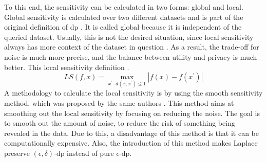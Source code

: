 To this end, the sensitivity can be calculated in two forms: global and local.
Global sensitivity is calculated over two different datasets and is part of the original definition of \gls{dp} \citep{dwork_differential_2006}.
It is called global because it is independent of the queried dataset.
Usually, this is not the desired situation, since local sensitivity always has more context of the dataset in question \citep{nissim_smooth_2007}.
As a result, the trade-off for noise is much more precise, and the balance between utility and privacy is much better.
This local sensitivity definition \citep{nissim_smooth_2007}.
\begin{equation}
  LS(f,x)=\operatorname*{max}_{x^{\prime}\cdot d(x,x^{\prime})\leq1}|f(x)-f(x^{\prime})|
  \label{local-sensitivity}
\end{equation}
A methodology to calculate the local sensitivity is by using the smooth sensitivity method, which was proposed by the same authors \citep{nissim_smooth_2007}.
This method aims at smoothing out the local sensitivity by focusing on reducing the noise.
The goal is to smooth out the amount of noise, to reduce the risk of something being revealed in the data.
Due to this, a disadvantage of this method is that it can be computationally expensive.
Also, the introduction of this method makes Laplace preserve $(\epsilon, \delta)$-\gls{dp} instead of pure $\epsilon$-\gls{dp}.



